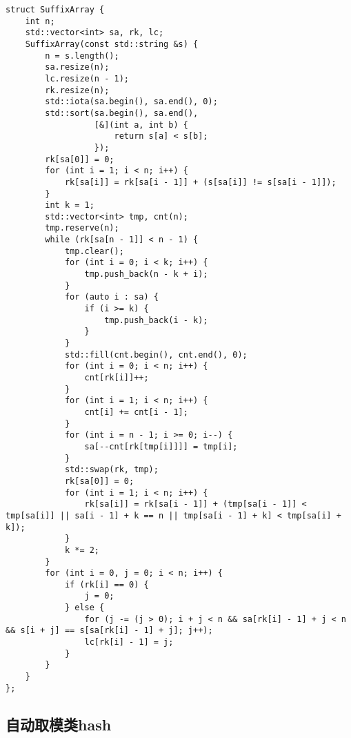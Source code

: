 \documentclass[a4paper,10pt]{article}
\begin{document}
\noindent\begin{lstlisting}
struct SuffixArray {
    int n;
    std::vector<int> sa, rk, lc;
    SuffixArray(const std::string &s) {
        n = s.length();
        sa.resize(n);
        lc.resize(n - 1);
        rk.resize(n);
        std::iota(sa.begin(), sa.end(), 0);
        std::sort(sa.begin(), sa.end(),
                  [&](int a, int b) {
                      return s[a] < s[b];
                  });
        rk[sa[0]] = 0;
        for (int i = 1; i < n; i++) {
            rk[sa[i]] = rk[sa[i - 1]] + (s[sa[i]] != s[sa[i - 1]]);
        }
        int k = 1;
        std::vector<int> tmp, cnt(n);
        tmp.reserve(n);
        while (rk[sa[n - 1]] < n - 1) {
            tmp.clear();
            for (int i = 0; i < k; i++) {
                tmp.push_back(n - k + i);
            }
            for (auto i : sa) {
                if (i >= k) {
                    tmp.push_back(i - k);
                }
            }
            std::fill(cnt.begin(), cnt.end(), 0);
            for (int i = 0; i < n; i++) {
                cnt[rk[i]]++;
            }
            for (int i = 1; i < n; i++) {
                cnt[i] += cnt[i - 1];
            }
            for (int i = n - 1; i >= 0; i--) {
                sa[--cnt[rk[tmp[i]]]] = tmp[i];
            }
            std::swap(rk, tmp);
            rk[sa[0]] = 0;
            for (int i = 1; i < n; i++) {
                rk[sa[i]] = rk[sa[i - 1]] + (tmp[sa[i - 1]] < tmp[sa[i]] || sa[i - 1] + k == n || tmp[sa[i - 1] + k] < tmp[sa[i] + k]);
            }
            k *= 2;
        }
        for (int i = 0, j = 0; i < n; i++) {
            if (rk[i] == 0) {
                j = 0;
            } else {
                for (j -= (j > 0); i + j < n && sa[rk[i] - 1] + j < n && s[i + j] == s[sa[rk[i] - 1] + j]; j++);
                lc[rk[i] - 1] = j;
            }
        }
    }
};\end{lstlisting}

\subsection{自动取模类hash}
\thispagestyle{fancy}
\end{document}
